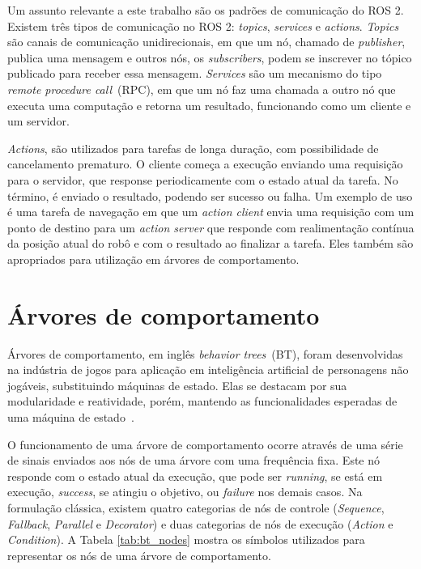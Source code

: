 \documentclass[repeatfields,xlists,xpacks,oneside,yearsonly]{ufrgscca}
\begin{document}
Um assunto relevante a este trabalho são os padrões de comunicação do ROS 2.
Existem três tipos de comunicação no ROS 2: \textit{topics}, \textit{services} e \textit{actions}.
\textit{Topics} são canais de comunicação unidirecionais, em que um nó, chamado de \textit{publisher},
publica uma mensagem e outros nós, os \textit{subscribers}, podem se inscrever no tópico publicado
para receber essa mensagem.
\textit{Services} são um mecanismo do tipo \textit{remote procedure call}~(RPC),
em que um nó faz uma chamada a outro nó que executa uma computação e retorna um resultado,
funcionando como um cliente e um servidor.

\textit{Actions}, são utilizados para tarefas de longa duração, com possibilidade de
cancelamento prematuro.
O cliente começa a execução enviando uma requisição para o servidor,
que response periodicamente com o estado atual da tarefa.
No término, é enviado o resultado, podendo ser sucesso ou falha.
Um exemplo de uso é uma tarefa de navegação em que um \textit{action client}
envia uma requisição com um ponto de destino para um \textit{action server}
que responde com realimentação contínua da posição atual do robô e
com o resultado ao finalizar a tarefa.
Eles também são apropriados para utilização em árvores de comportamento.

\section{Árvores de comportamento}

Árvores de comportamento, em inglês \textit{behavior trees}~(BT), foram desenvolvidas
na indústria de jogos para aplicação em inteligência artificial de personagens
não jogáveis, substituindo máquinas de estado.
Elas se destacam por sua modularidade e reatividade, porém, mantendo as funcionalidades
esperadas de uma máquina de estado~\cite{BehaviorTree}.

O funcionamento de uma árvore de comportamento ocorre através de uma série de
sinais enviados aos nós de uma árvore com uma frequência fixa.
Este nó responde com o estado atual da execução, que pode ser \textit{running},
se está em execução, \textit{success}, se atingiu o objetivo, ou \textit{failure}
nos demais casos.
Na formulação clássica, existem quatro categorias de nós de controle (\textit{Sequence},
\textit{Fallback}, \textit{Parallel} e \textit{Decorator}) e duas categorias
de nós de execução (\textit{Action} e \textit{Condition}).
A Tabela \ref{tab:bt_nodes} mostra os símbolos utilizados para representar
os nós de uma árvore de comportamento.
\end{document}
